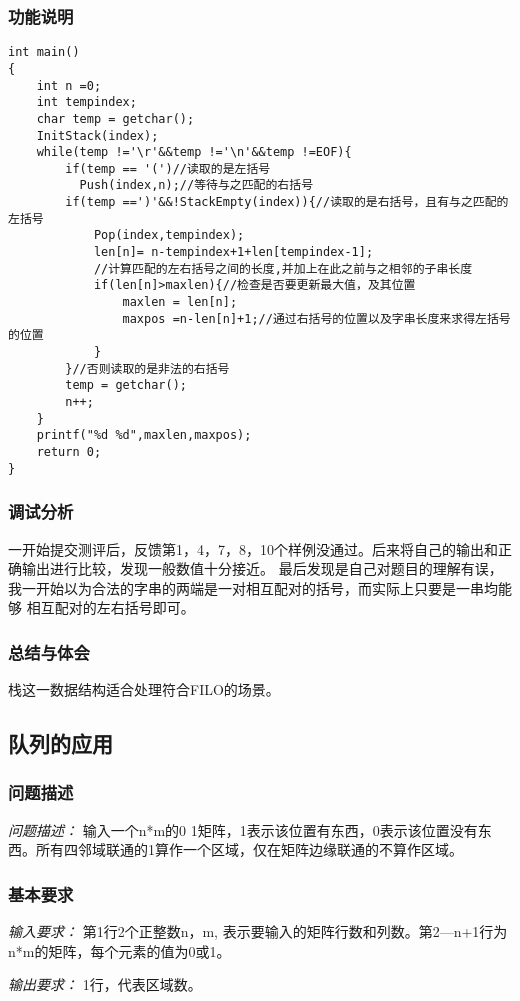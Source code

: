 \documentclass[a4paper,11pt]{article}%
\newenvironment{shadedquotation}
 {\begin{shaded*}
  \quoting[leftmargin=0pt, vskip=0pt]
 }
 {\endquoting
 \end{shaded*}
}
\begin{document}
\subsubsection{功能说明}
\begin{lstlisting}[language={[ANSI]C},keywordstyle=\color{blue!70},commentstyle=\color{red!50!green!50!blue!50},frame=shadowbox,
				rulesepcolor=\color{red!20!green!20!blue!20}]
int main()
{
	int n =0;
	int tempindex;
	char temp = getchar();
	InitStack(index);
	while(temp !='\r'&&temp !='\n'&&temp !=EOF){
		if(temp == '(')//读取的是左括号
		  Push(index,n);//等待与之匹配的右括号
		if(temp ==')'&&!StackEmpty(index)){//读取的是右括号，且有与之匹配的左括号
			Pop(index,tempindex);
			len[n]= n-tempindex+1+len[tempindex-1];
            //计算匹配的左右括号之间的长度,并加上在此之前与之相邻的子串长度
			if(len[n]>maxlen){//检查是否要更新最大值，及其位置
				maxlen = len[n];
				maxpos =n-len[n]+1;//通过右括号的位置以及字串长度来求得左括号的位置
			}
        }//否则读取的是非法的右括号
		temp = getchar();
		n++;
	}
	printf("%d %d",maxlen,maxpos);
	return 0;
}
\end{lstlisting}
\subsubsection{调试分析}
一开始提交测评后，反馈第1，4，7，8，10个样例没通过。后来将自己的输出和正确输出进行比较，发现一般数值十分接近。
最后发现是自己对题目的理解有误，我一开始以为合法的字串的两端是一对相互配对的括号，而实际上只要是一串均能够
相互配对的左右括号即可。
\subsubsection{总结与体会}
栈这一数据结构适合处理符合FILO的场景。
\subsection{队列的应用}
\subsubsection{问题描述}
\begin{shadedquotation}
    \emph{问题描述：}
    输入一个n*m的0 1矩阵，1表示该位置有东西，0表示该位置没有东西。所有四邻域联通的1算作一个区域，仅在矩阵边缘联通的不算作区域。
\end{shadedquotation}
\subsubsection{基本要求}
\begin{shadedquotation}
    \emph{输入要求：}
    第1行2个正整数n，m, 表示要输入的矩阵行数和列数。第2—n+1行为n*m的矩阵，每个元素的值为0或1。
\end{shadedquotation}
\begin{shadedquotation}
    \emph{输出要求：}
    1行，代表区域数。
\end{shadedquotation}
\end{document}
